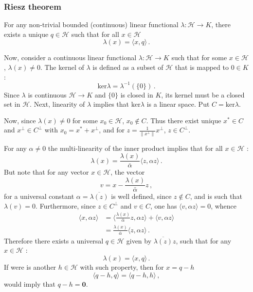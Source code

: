 \documentclass[a4paper]{article}
\newcommand{\Hcal}{\mathcal{H}}
\begin{document}

\subsubsection{Riesz theorem} %
\label{ssub:riesz_theorem}
For any non-trivial bounded (continuous) linear functional $\lambda:\Hcal\to K$,
there exists a unique $q\in \Hcal$ such that for all $x\in \Hcal$
\[ \lambda(x) = \langle x, q \rangle \,. \]

Now, consider a continuous linear functional $\lambda:\Hcal \to K$ such that for
some $x\in \Hcal$, $\lambda(x)\neq 0$. The kernel of $\lambda$ is defined as a subset
of $\Hcal$ that is mapped to $0\in K$ :
\[ \text{ker}\lambda = \lambda^{-1}(\{0\}) \,. \]
Since $\lambda$ is continuous $\Hcal\to K$ and $\{0\}$ is closed in $K$, its kernel
must be a closed set in $\Hcal$. Next, linearity of $\lambda$ implies that $\text{ker} \lambda$
is a linear space. Put $C = \text{ker}\lambda $.

Now, since $\lambda(x)\neq 0$ for some $x_0\in \Hcal$, $x_0\notin C$. Thus there
exist unique $x^*\in C$ and $x^\perp \in C^\perp$ with $x_0 = x^*+x^\perp$, and
for $z = \frac{1}{\|x^\perp\|} x^\perp$, $z\in C^\perp$.

For any $\alpha \neq 0$ the multi-linearity of the inner product implies that for
all $x\in \Hcal$ :
\[ \lambda(x) = \frac{\lambda(x)}{\bar{\alpha}} \langle z, \alpha z \rangle \,. \]
But note that for any vector $x\in \Hcal$, the vector
\[ v = x - \frac{\lambda(x)}{\bar{\alpha}} z\,, \]
for a universal constant $\alpha = \overline{\lambda(z)}$ is well defined, since
$z\notin C$, and is such that $\lambda(v) = 0$. Furthermore, since $z\in C^\perp$
and $v\in C$, one has $\langle v, \alpha z \rangle = 0$, whence
\begin{align*}
	\langle x, \alpha z \rangle
	&= \biggl \langle \frac{\lambda(x)}{\bar{\alpha}} z, \alpha z \biggr\rangle
	+ \langle v, \alpha z \rangle \\
	&= \frac{\lambda(x)}{\bar{\alpha}} \langle z, \alpha z \rangle \,.
\end{align*}
Therefore there exists a universal $q\in \Hcal$ given by $ \overline{\lambda(z)} z$, such
that for any $x\in\Hcal$ :
\[ \lambda(x) = \langle x, q \rangle \,. \]
If were is another $h\in \Hcal$ with such property, then for $x=q-h$
\[ \langle q-h, q \rangle =  \langle q-h, h \rangle \,, \]
would imply that $q-h = \mathbf{0}$.

\end{document}
